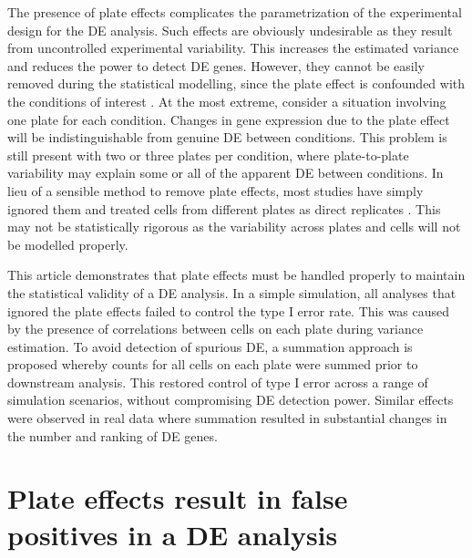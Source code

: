 \documentclass{article}
\begin{document}
The presence of plate effects complicates the parametrization of the experimental design for the DE analysis.
Such effects are obviously undesirable as they result from uncontrolled experimental variability.
This increases the estimated variance and reduces the power to detect DE genes.
However, they cannot be easily removed during the statistical modelling, since the plate effect is confounded with the conditions of interest \cite{hicks2015widespread}.
At the most extreme, consider a situation involving one plate for each condition.
Changes in gene expression due to the plate effect will be indistinguishable from genuine DE between conditions.
This problem is still present with two or three plates per condition, where plate-to-plate variability may explain some or all of the apparent DE between conditions.
In lieu of a sensible method to remove plate effects, most studies have simply ignored them and treated cells from different plates as direct replicates \cite{kolod2015single,trapnell2014dynamics,avraham2015pathogen}.
This may not be statistically rigorous as the variability across plates and cells will not be modelled properly.

This article demonstrates that plate effects must be handled properly to maintain the statistical validity of a DE analysis.
In a simple simulation, all analyses that ignored the plate effects failed to control the type I error rate.
This was caused by the presence of correlations between cells on each plate during variance estimation.
To avoid detection of spurious DE, a summation approach is proposed whereby counts for all cells on each plate were summed prior to downstream analysis.
This restored control of type I error across a range of simulation scenarios, without compromising DE detection power.
Similar effects were observed in real data where summation resulted in substantial changes in the number and ranking of DE genes.

\section{Plate effects result in false positives in a DE analysis}
\end{document}

